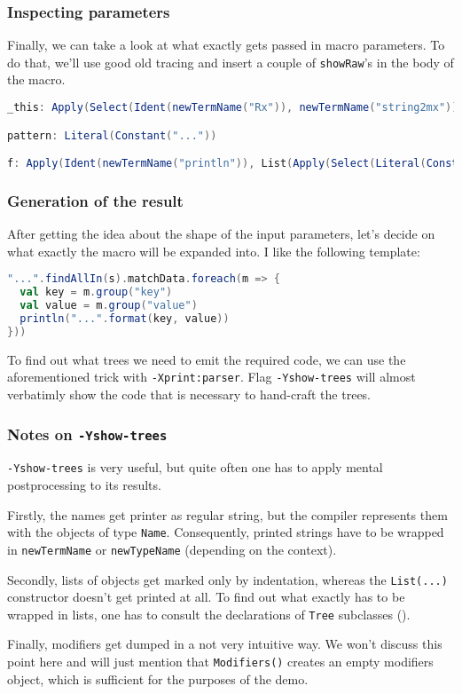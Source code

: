 \documentclass[hyperref={bookmarks=false}]{beamer}
\begin{document}
\begin{frame}[t,fragile]
\frametitle{Inspecting parameters}

Finally, we can take a look at what exactly gets passed in macro parameters. To do that, we'll use good old tracing and insert a couple of \texttt{showRaw}'s in the body of the macro.

\begin{lstlisting}[language=scala]
_this: Apply(Select(Ident(newTermName("Rx")), newTermName("string2mx")), List(Select(This(newTypeName("Test")), newTermName("s"))))

pattern: Literal(Constant("..."))

f: Apply(Ident(newTermName("println")), List(Apply(Select(Literal(Constant("...")), newTermName("format")), List(Ident(newTermName("key")), Ident(newTermName("value"))))))
\end{lstlisting}
\end{frame}

\begin{frame}[t,fragile]
\frametitle{Generation of the result}

After getting the idea about the shape of the input parameters, let's decide on what exactly the macro will be expanded into. I like the following template:

\begin{lstlisting}[language=scala]
"...".findAllIn(s).matchData.foreach(m => {
  val key = m.group("key")
  val value = m.group("value")
  println("...".format(key, value))
}))
\end{lstlisting}

To find out what trees we need to emit the required code, we can use the aforementioned trick with \texttt{-Xprint:parser}. Flag \texttt{-Yshow-trees} will almost verbatimly show the code that is necessary to hand-craft the trees.
\end{frame}

\begin{frame}[t,fragile]
\frametitle{Notes on \texttt{-Yshow-trees}}

\texttt{-Yshow-trees} is very useful, but quite often one has to apply mental postprocessing to its results.

Firstly, the names get printer as regular string, but the compiler represents them with the objects of type \texttt{Name}. Consequently, printed strings have to be wrapped in \texttt{newTermName} or \texttt{newTypeName} (depending on the context).

Secondly, lists of objects get marked only by indentation, whereas the \texttt{List(...)} constructor doesn't get printed at all. To find out what exactly has to be wrapped in lists, one has to consult the declarations of \texttt{Tree} subclasses ().

Finally, modifiers get dumped in a not very intuitive way. We won't discuss this point here and will just mention that \texttt{Modifiers()} creates an empty modifiers object, which is sufficient for the purposes of the demo.
\end{frame}
\end{document}
